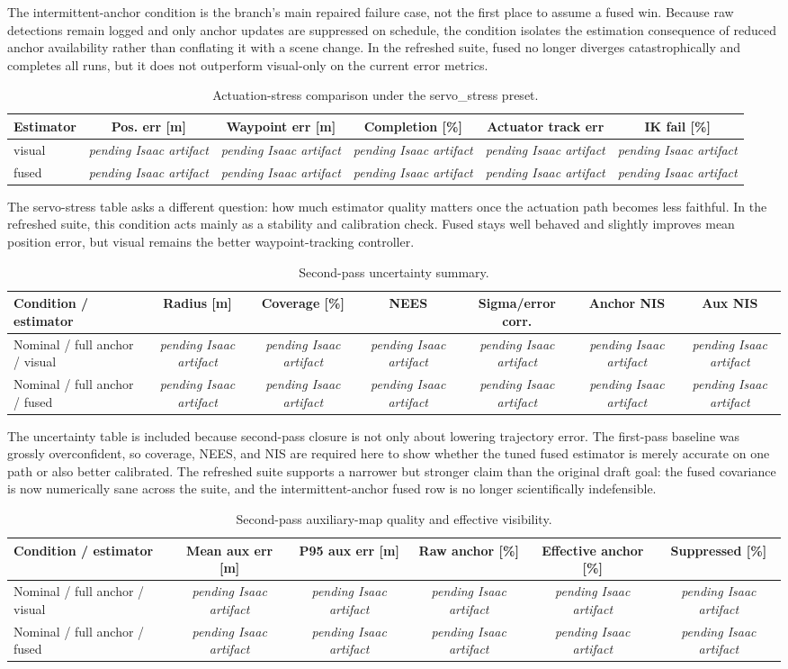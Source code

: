 \documentclass[11pt]{article}
\newcommand{\ArtifactPending}{\textit{pending Isaac artifact}}
\newcommand{\IsaacSecondPassActuationStressRows}{%
visual & \ArtifactPending{} & \ArtifactPending{} & \ArtifactPending{} & \ArtifactPending{} & \ArtifactPending{} \\
fused & \ArtifactPending{} & \ArtifactPending{} & \ArtifactPending{} & \ArtifactPending{} & \ArtifactPending{} \\
}
\newcommand{\IsaacSecondPassUncertaintyRows}{%
Nominal / full anchor / visual & \ArtifactPending{} & \ArtifactPending{} & \ArtifactPending{} & \ArtifactPending{} & \ArtifactPending{} & \ArtifactPending{} \\
Nominal / full anchor / fused & \ArtifactPending{} & \ArtifactPending{} & \ArtifactPending{} & \ArtifactPending{} & \ArtifactPending{} & \ArtifactPending{} \\
}
\newcommand{\IsaacSecondPassMapQualityRows}{%
Nominal / full anchor / visual & \ArtifactPending{} & \ArtifactPending{} & \ArtifactPending{} & \ArtifactPending{} & \ArtifactPending{} \\
Nominal / full anchor / fused & \ArtifactPending{} & \ArtifactPending{} & \ArtifactPending{} & \ArtifactPending{} & \ArtifactPending{} \\
}
\begin{document}
The intermittent-anchor condition is the branch's main repaired failure case, not the first place to assume a fused win. Because raw detections remain logged and only anchor updates are suppressed on schedule, the condition isolates the estimation consequence of reduced anchor availability rather than conflating it with a scene change. In the refreshed suite, fused no longer diverges catastrophically and completes all runs, but it does not outperform visual-only on the current error metrics.

\begin{table}[H]
\centering
\caption{Actuation-stress comparison under the servo\_stress preset.}
\begin{tabular}{lccccc}
\toprule
Estimator & Pos. err [m] & Waypoint err [m] & Completion [\%] & Actuator track err & IK fail [\%] \\
\midrule
\IsaacSecondPassActuationStressRows
\bottomrule
\end{tabular}
\end{table}

The servo-stress table asks a different question: how much estimator quality matters once the actuation path becomes less faithful. In the refreshed suite, this condition acts mainly as a stability and calibration check. Fused stays well behaved and slightly improves mean position error, but visual remains the better waypoint-tracking controller.

\begin{table}[H]
\centering
\caption{Second-pass uncertainty summary.}
\begin{tabular}{lcccccc}
\toprule
Condition / estimator & Radius [m] & Coverage [\%] & NEES & Sigma/error corr. & Anchor NIS & Aux NIS \\
\midrule
\IsaacSecondPassUncertaintyRows
\bottomrule
\end{tabular}
\end{table}

The uncertainty table is included because second-pass closure is not only about lowering trajectory error. The first-pass baseline was grossly overconfident, so coverage, NEES, and NIS are required here to show whether the tuned fused estimator is merely accurate on one path or also better calibrated. The refreshed suite supports a narrower but stronger claim than the original draft goal: the fused covariance is now numerically sane across the suite, and the intermittent-anchor fused row is no longer scientifically indefensible.

\begin{table}[H]
\centering
\caption{Second-pass auxiliary-map quality and effective visibility.}
\begin{tabular}{lccccc}
\toprule
Condition / estimator & Mean aux err [m] & P95 aux err [m] & Raw anchor [\%] & Effective anchor [\%] & Suppressed [\%] \\
\midrule
\IsaacSecondPassMapQualityRows
\bottomrule
\end{tabular}
\end{table}
\end{document}
